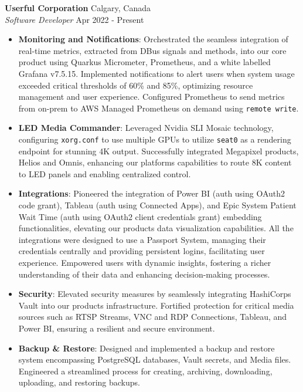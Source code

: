 \documentclass[a4paper]{article}
\newcommand{\resumeItemExperience}[2]{
  \item{
    \begin{justify}
    \setlength{\rightskip}{0.15in} \textbf{#1}{: #2 \vspace{-2pt}}
    \end{justify}
  }
}
\begin{document}
\textbf{Userful Corporation} \hfill Calgary, Canada\\
\textit{Software Developer} \hfill Apr 2022 - Present\\
\vspace{-1mm}
\begin{itemize} \itemsep 1pt
    \resumeItemExperience {Monitoring and Notifications}{Orchestrated the seamless integration of real-time metrics, extracted from DBus signals and methods, into our core product using Quarkus Micrometer, Prometheus, and a white labelled Grafana v7.5.15. Implemented notifications to alert users when system usage exceeded critical thresholds of 60\% and 85\%, optimizing resource management and user experience. Configured Prometheus to send metrics from on-prem to AWS Managed Prometheus on demand using \texttt{remote write}.}

    \resumeItemExperience {LED Media Commander} {Leveraged Nvidia SLI Mosaic technology, configuring \texttt{xorg.conf} to use multiple GPUs to utilize \texttt{seat0} as a rendering endpoint for stunning 4K output. Successfully integrated Megapixel products, Helios and Omnis, enhancing our platform\textquotesingle{}s capabilities to route 8K content to LED panels and enabling centralized control.}

    \resumeItemExperience{Integrations} {Pioneered the integration of Power BI (auth using OAuth2 code grant), Tableau (auth using Connected Apps), and Epic System Patient Wait Time (auth using OAuth2 client credentials grant) embedding functionalities, elevating our product\textquotesingle{}s data visualization capabilities. All the integrations were designed to use a \textquotesingle{}Passport System\textquotesingle{}, managing their credentials centrally and providing persistent logins, facilitating user experience. Empowered users with dynamic insights, fostering a richer understanding of their data and enhancing decision-making processes.}

    \resumeItemExperience{Security} {Elevated security measures by seamlessly integrating HashiCorp\textquotesingle{}s Vault into our product\textquotesingle{}s infrastructure. Fortified protection for critical media sources such as RTSP Streams, VNC and RDP Connections, Tableau, and Power BI, ensuring a resilient and secure environment.}

    \resumeItemExperience{Backup \& Restore} {Designed and implemented a backup and restore system encompassing PostgreSQL databases, Vault secrets, and Media files. Engineered a streamlined process for creating, archiving, downloading, uploading, and restoring backups.}
\end{itemize}
\end{document}
